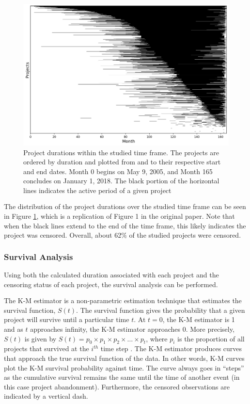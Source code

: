 \documentclass[sigconf]{acmart}
\begin{document}
\begin{figure}[ht!]
    \centering
    \includegraphics[width=\columnwidth, keepaspectratio=true]{figure1.jpg}
    \caption{
        Project durations within the studied time frame.
        The projects are ordered by duration and plotted from and to their respective start and end dates.
        Month 0 begins on May 9, 2005, and Month 165 concludes on January 1, 2018.
        The black portion of the horizontal lines indicates the active period of a given project
        }
    \label{fig:figure-1}
\end{figure}

The distribution of the project durations over the studied time frame can be seen in Figure \ref{fig:figure-1}, which is a replication of Figure 1 in the original paper.
Note that when the black lines extend to the end of the time frame, this likely indicates the project was censored.
Overall, about 62\% of the studied projects were censored.

\subsubsection{Survival Analysis} \label{surv_analysis}

Using both the calculated duration associated with each project and the censoring status of each project, the survival analysis can be performed.

The K-M estimator is a non-parametric estimation technique that estimates the survival function, $S(t)$.
The survival function gives the probability that a given project will survive until a particular time $t$.
At $t = 0$, the K-M estimator is 1 and as $t$ approaches infinity, the K-M estimator approaches 0.
More precisely, $S(t)$ is given by  $S(t) = p_0 \times p_1 \times p_2 \times \dots \times p_t$, where $p_i$ is the proportion of all projects that survived at the $i^{th}$ time step \cite{kaplan1958nonparametric}.
The K-M estimator produces curves that approach the true survival function of the data.
In other words, K-M curves plot the K-M survival probability against time.
The curve always goes in ``steps'' as the cumulative survival remains the same until the time of another event (in this case project abandonment). Furthermore, the censored observations are indicated by a vertical dash.
\end{document}
